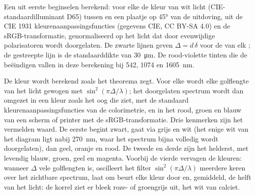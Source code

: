 \begin{omfigure}
{\small Een  uit eerste beginselen berekend: voor elke  de kleur van wit licht (CIE-standaardilluminant D65) tussen  en een plaatje op \ang{45} van de uitdoving, uit de CIE 1931 kleurenaanpassingsfuncties (gegevens \textcopyright{} CIE, CC BY-SA 4.0) en de sRGB-transformatie,
genormaliseerd op het licht dat door evenwijdige polarisatoren wordt doorgelaten. De zwarte lijnen geven $\Delta = d\,\delta$ voor de  van elk ;
de gestreepte lijn is de standaarddikte van \qty{30}{\micro m}. De rood-violette tinten die de  beëindigen vallen in deze berekening bij 542, 1074 en \qty{1605}{nm}.}
\end{omfigure}

De kleur wordt berekend zoals het theorema zegt. Voor elke  wordt elke golflengte van het licht gewogen met $\sin^2(\pi\Delta/\lambda)$; het doorgelaten
spectrum wordt dan omgezet in een kleur zoals het oog die ziet, met de standaard kleurenaanpassingsfuncties van de colorimetrie, en in het rood, groen en
blauw van een scherm of printer met de sRGB-transformatie. Drie kenmerken zijn het vermelden waard. De eerste  begint zwart, gaat via grijs en wit
(het enige wit van het diagram ligt nabij \qty{270}{nm}, waar het spectrum bijna volledig wordt doorgelaten), dan geel, oranje en rood. De tweede en derde
 zijn het helderst, met levendig blauw, groen, geel en magenta. Voorbij de vierde  vervagen de kleuren: wanneer $\Delta$ vele golflengten is,
oscilleert het filter $\sin^2(\pi\Delta/\lambda)$ meerdere keren over het zichtbare spectrum, laat om beurt elke kleur door en, gemiddeld, de helft van het licht:
de korrel ziet er bleek roze- of groengrijs uit, het  wit van calciet.

